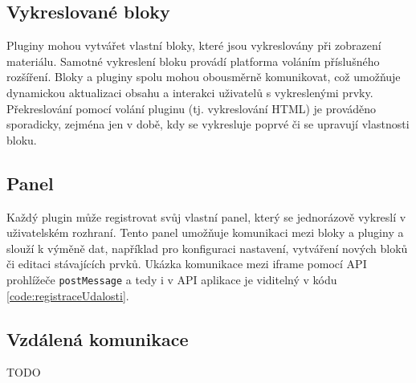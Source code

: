 \subsection{Vykreslované bloky}

Pluginy mohou vytvářet vlastní bloky, které jsou vykreslovány při zobrazení materiálu. 
Samotné vykreslení bloku provádí platforma voláním příslušného rozšíření. 
Bloky a pluginy spolu mohou obousměrně komunikovat, což umožňuje dynamickou aktualizaci obsahu a interakci uživatelů s vykreslenými prvky.
Překreslování pomocí volání pluginu (tj. vykreslování HTML) je prováděno sporadicky, zejména jen v době, kdy se vykresluje poprvé či se upravují vlastnosti bloku.

\subsection{Panel}

Každý plugin může registrovat svůj vlastní panel, který se jednorázově vykreslí v uživatelském rozhraní. 
Tento panel umožňuje komunikaci mezi bloky a pluginy a slouží k výměně dat, například pro konfiguraci nastavení, vytváření nových bloků či editaci stávajících prvků. 
Ukázka komunikace mezi iframe pomocí API prohlížeče \texttt{postMessage} a tedy i v API aplikace je viditelný v kódu \ref{code:registraceUdalosti}.

\subsection{Vzdálená komunikace}

TODO





